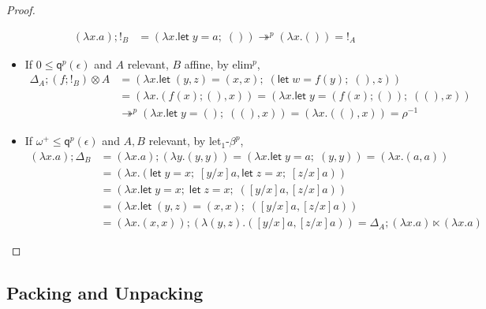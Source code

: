 \documentclass[acmsmall,screen,review]{acmart}
\newcommand{\mc}[1]{\ensuremath{\mathcal{#1}}}
\newcommand{\ms}[1]{\ensuremath{\mathsf{#1}}}
\newcommand{\letexpr}[3]{\ensuremath{\ms{let}\;#1 = #2;\;#3}}
\newcommand{\cref}{\twoheadrightarrow}
\newcommand{\brle}[1]{{\textsf{#1}}}
\newcommand{\tmor}[1]{{!}_{#1}}
\newcommand{\dmor}[1]{{\Delta}_{#1}}
\newcommand{\subiterexp}{\texorpdfstring{\(\lambda_{\ms{iter}}\)}{lambda-iter}}
\newcommand{\alquant}{\ms{q}}
\begin{document}
\begin{proof}
\begin{itemize}
\begin{align*}
  (\lambda x.a) ; {!}_B &= (\lambda x. \letexpr{y}{a}{()}) \cref^p (\lambda x.()) = {!}_A
  \end{align*}
  \item If $0 \leq \alquant^p(\epsilon)$ and $A$ relevant, $B$ affine, by \brle{elim$^p$}, 
  \begin{align*}
  \dmor{A} ; (f ; \tmor{B}) \otimes A &= (\lambda x. 
    \letexpr{(y, z)}{(x, x)}{(\letexpr{w}{f(y)}{()}, z)})
    \\
    &= (\lambda x. (f(x) ; (), x)) = (\lambda x . \letexpr{y}{(f(x) ; ())}{((), x)}) \\
    & \cref^p (\lambda x. \letexpr{y}{()}{((), x)})
      = (\lambda x. ((), x)) = \rho^{-1}
  \end{align*}
  \item If $\omega^+ \leq \alquant^p(\epsilon)$ and $A, B$ relevant, by \brle{let$_1$-$\beta^p$}, 
  \begin{align*}
    (\lambda x.a) ; \dmor{B} &= (\lambda x.a) ; (\lambda y.(y, y)) 
    = (\lambda x.\letexpr{y}{a}{(y, y)})
    = (\lambda x. (a, a)) \\
    &= (\lambda x. (\letexpr{y}{x}{[y/x]a}, \letexpr{z}{x}{[z/x]a})) \\
    &= (\lambda x. \letexpr{y}{x}{\letexpr{z}{x}{([y/x]a, [z/x]a)}}) \\
    &= (\lambda x . \letexpr{(y, z)}{(x, x)}{([y/x]a, [z/x]a)}) \\
    &= (\lambda x. (x, x)) ; (\lambda (y, z). ([y/x]a, [z/x]a)) 
     = \dmor{A} ; (\lambda x.a) \ltimes (\lambda x.a)
  \end{align*}
\end{itemize}
\end{proof}

\subsection{Packing and Unpacking}

\label{apx:packing}
\end{document}
